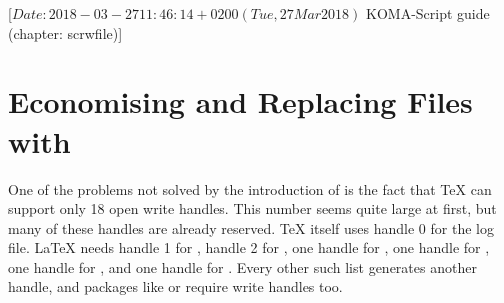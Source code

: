%
%
%
%
%
%
%
%
% 
%
%
%
%

%
                 [$Date: 2018-03-27 11:46:14 +0200 (Tue, 27 Mar 2018) $
                  KOMA-Script guide (chapter: scrwfile)]



\chapter{Economising and Replacing Files with }
\BeginIndexGroup
{}

One of the problems not solved by the introduction of \eTeX{} is the fact that
\TeX{} can support only 18 open write handles. This number seems quite large
at first, but many of these handles are already reserved. \TeX{} itself uses
handle 0 for the log file. \LaTeX{} needs handle 1 for ,
handle 2 for , one handle for , one
handle for , one handle for , and one
handle for . Every other such list generates another handle,
and packages like  or  require write
handles too.

